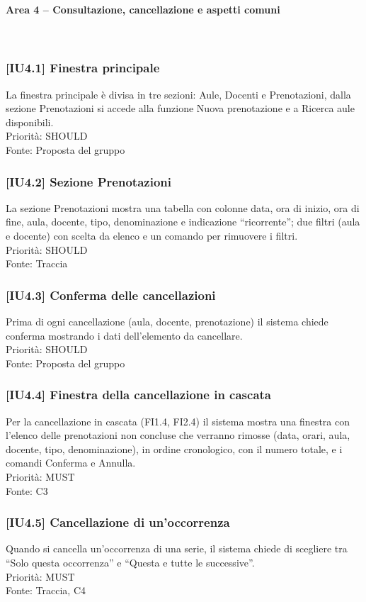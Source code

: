 \paragraph{Area 4 – Consultazione, cancellazione e aspetti comuni}~\\
\subsubsection{[IU4.1] Finestra principale}
La finestra principale è divisa in tre sezioni: Aule, Docenti e Prenotazioni, dalla sezione Prenotazioni si accede alla funzione Nuova prenotazione e a Ricerca aule disponibili.\\
Priorità: SHOULD\\Fonte: Proposta del gruppo

\subsubsection{[IU4.2] Sezione Prenotazioni}
La sezione Prenotazioni mostra una tabella con colonne data, ora di inizio, ora di fine, aula, docente, tipo, denominazione e indicazione ``ricorrente''; due filtri (aula e docente) con scelta da elenco e un comando per rimuovere i filtri.\\
Priorità: SHOULD\\Fonte: Traccia

\subsubsection{[IU4.3] Conferma delle cancellazioni}
Prima di ogni cancellazione (aula, docente, prenotazione) il sistema chiede conferma mostrando i dati dell'elemento da cancellare.\\
Priorità: SHOULD\\Fonte: Proposta del gruppo

\subsubsection{[IU4.4] Finestra della cancellazione in cascata}
Per la cancellazione in cascata (FI1.4, FI2.4) il sistema mostra una finestra con l'elenco delle prenotazioni non concluse che verranno rimosse (data, orari, aula, docente, tipo, denominazione), in ordine cronologico, con il numero totale, e i comandi Conferma e Annulla.\\
Priorità: MUST\\Fonte: C3

\subsubsection{[IU4.5] Cancellazione di un'occorrenza}
Quando si cancella un'occorrenza di una serie, il sistema chiede di scegliere tra ``Solo questa occorrenza'' e ``Questa e tutte le successive''.\\
Priorità: MUST\\Fonte: Traccia, C4

